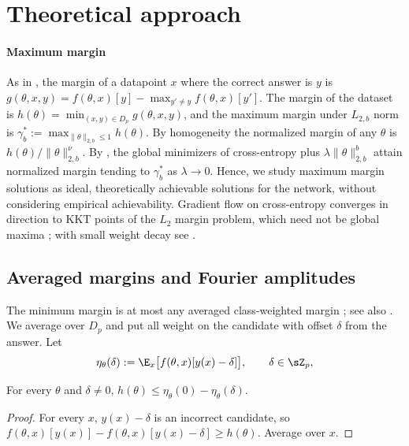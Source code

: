 \section{Theoretical approach}\label{sec:approach}

\paragraph{Maximum margin} As in \citet{morwani2024feature}, the margin of a datapoint $x$ where the correct answer is $y$ is $g(\theta,x,y)=f(\theta,x)[y]-\max_{y'\neq y}f(\theta,x)[y']$. 
The margin of the dataset is $h(\theta)=\min_{(x,y)\in D_p}g(\theta,x,y)$, and the maximum margin under $L_{2,b}$ norm is $\gamma^*_b:=\max_{\|\theta\|_{2,b}\le1}h(\theta)$. 
By homogeneity the normalized margin of any $\theta$ is $h(\theta)/\|\theta\|_{2,b}^\nu$. 
By \citet[Thm.~4.1; Thm.~C.1 for multi-class cross-entropy]{wei2019regularization}, the global minimizers of cross-entropy plus $\lambda\|\theta\|_{2,b}^b$ attain normalized margin tending to $\gamma^*_b$ as $\lambda\to0$.
Hence, we study maximum margin solutions as ideal, theoretically achievable solutions for the network, without considering empirical achievability. Gradient flow on cross-entropy converges in direction to KKT points of the $L_2$ margin problem, which need not be global maxima \citep{lyu2020gradient,vardi2022margin}; with small weight decay see \citet{lyu2024dichotomy}.

\subsection{Averaged margins and Fourier amplitudes}\label{sec:avg}

The minimum margin is at most any averaged class-weighted margin \citep[Section~3.2]{morwani2024feature}; see also \citet[Def.~3.6]{li2025nsum}. We average over $D_p$ and put all weight on the candidate with offset $\delta$ from the answer. Let
\[
\eta_\theta(\delta):=\E_x\big[f(\theta,x)[y(x)-\delta]\big],\qquad\delta\in\sZ_p,
\]

\begin{lemma}\label{lem:avg}
For every $\theta$ and $\delta\neq0$, $h(\theta)\le\eta_\theta(0)-\eta_\theta(\delta)$.
\end{lemma}
\begin{proof}
For every $x$, $y(x)-\delta$ is an incorrect candidate, so $f(\theta,x)[y(x)]-f(\theta,x)[y(x)-\delta]\ge h(\theta)$. Average over $x$.
\end{proof}

